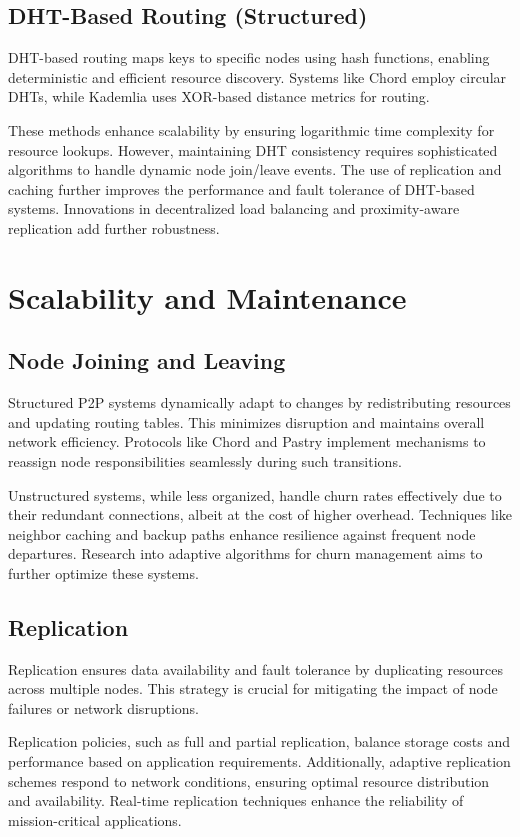 \documentclass[12pt]{article}
\begin{document}
\subsection{DHT-Based Routing (Structured)}
DHT-based routing maps keys to specific nodes using hash functions, enabling deterministic and efficient resource discovery. Systems like Chord employ circular DHTs, while Kademlia uses XOR-based distance metrics for routing.

These methods enhance scalability by ensuring logarithmic time complexity for resource lookups. However, maintaining DHT consistency requires sophisticated algorithms to handle dynamic node join/leave events. The use of replication and caching further improves the performance and fault tolerance of DHT-based systems. Innovations in decentralized load balancing and proximity-aware replication add further robustness.

\section{Scalability and Maintenance}

\subsection{Node Joining and Leaving}
Structured P2P systems dynamically adapt to changes by redistributing resources and updating routing tables. This minimizes disruption and maintains overall network efficiency. Protocols like Chord and Pastry implement mechanisms to reassign node responsibilities seamlessly during such transitions.

Unstructured systems, while less organized, handle churn rates effectively due to their redundant connections, albeit at the cost of higher overhead. Techniques like neighbor caching and backup paths enhance resilience against frequent node departures. Research into adaptive algorithms for churn management aims to further optimize these systems.

\subsection{Replication}
Replication ensures data availability and fault tolerance by duplicating resources across multiple nodes. This strategy is crucial for mitigating the impact of node failures or network disruptions.

Replication policies, such as full and partial replication, balance storage costs and performance based on application requirements. Additionally, adaptive replication schemes respond to network conditions, ensuring optimal resource distribution and availability. Real-time replication techniques enhance the reliability of mission-critical applications.
\end{document}
